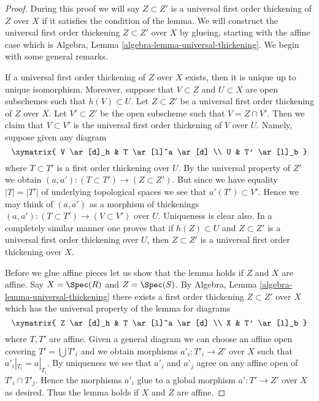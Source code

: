 \begin{proof}
During this proof we will say $Z \subset Z'$ is a universal first order
thickening of $Z$ over $X$ if it satisfies the condition of the lemma.
We will construct the universal first order thickening $Z \subset Z'$ over $X$
by glueing, starting with the affine case which is
Algebra, Lemma \ref{algebra-lemma-universal-thickening}.
We begin with some general remarks.

\medskip\noindent
If a universal first order thickening of $Z$ over $X$ exists, then it is unique
up to unique isomorphism. Moreover, suppose that $V \subset Z$ and
$U \subset X$ are open subschemes such that $h(V) \subset U$. Let
$Z \subset Z'$ be a universal first order thickening of $Z$ over $X$.
Let $V' \subset Z'$ be the open subscheme such that $V = Z \cap V'$.
Then we claim that $V \subset V'$ is the universal first order thickening of
$V$ over $U$. Namely, suppose given any diagram
$$
\xymatrix{
V \ar[d]_h & T \ar[l]^a \ar[d] \\
U & T' \ar[l]_b
}
$$
where $T \subset T'$ is a first order thickening over $U$. By the universal
property of $Z'$ we obtain $(a, a') : (T \subset T') \to (Z \subset Z')$.
But since we have equality $|T| = |T'|$ of underlying topological spaces
we see that $a'(T') \subset V'$. Hence we may think of $(a, a')$
as a morphism of thickenings $(a, a') : (T \subset T') \to (V \subset V')$
over $U$. Uniqueness is clear also. In a completely similar manner one proves
that if $h(Z) \subset U$ and $Z \subset Z'$ is a universal first order
thickening over $U$, then $Z \subset Z'$ is a universal first order thickening
over $X$.

\medskip\noindent
Before we glue affine pieces let us show that the lemma holds if
$Z$ and $X$ are affine. Say $X = \Spec(R)$ and $Z = \Spec(S)$. By
Algebra, Lemma \ref{algebra-lemma-universal-thickening}
there exists a first order thickening $Z \subset Z'$ over $X$
which has the universal property of the lemma for diagrams
$$
\xymatrix{
Z \ar[d]_h & T \ar[l]^a \ar[d] \\
X & T' \ar[l]_b
}
$$
where $T, T'$ are affine. Given a general diagram we can choose an affine
open covering $T' = \bigcup T'_i$ and we obtain morphisms
$a'_i : T'_i \to Z'$ over $X$ such that $a'_i|_{T_i} = a|_{T_i}$.
By uniqueness we see that $a'_i$ and $a'_j$ agree on any affine open
of $T'_i \cap T'_j$. Hence the morphisms $a'_i$ glue to a global morphism
$a' : T' \to Z'$ over $X$ as desired. Thus the lemma holds if $X$ and $Z$
are affine.


\end{proof}
